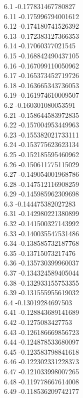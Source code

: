 {6.1	-0.177831467780827\\
6.11	-0.175996794001612\\
6.12	-0.174180741526392\\
6.13	-0.172383127366353\\
6.14	-0.17060377021545\\
6.15	-0.168842490437105\\
6.16	-0.167099110050962\\
6.17	-0.165373452719726\\
6.18	-0.163665343736053\\
6.19	-0.161974610009507\\
6.2	-0.160301080053591\\
6.21	-0.158644583972835\\
6.22	-0.157004953449963\\
6.23	-0.155382021733111\\
6.24	-0.153775623623134\\
6.25	-0.152185595460962\\
6.26	-0.150611775115029\\
6.27	-0.149054001968786\\
6.28	-0.147512116908259\\
6.29	-0.145985962309698\\
6.3	-0.144475382027283\\
6.31	-0.142980221380899\\
6.32	-0.141500327143992\\
6.33	-0.140035547531486\\
6.34	-0.138585732187768\\
6.35	-0.13715073217476\\
6.36	-0.135730399960037\\
6.37	-0.134324589405044\\
6.38	-0.132933155753355\\
6.39	-0.131555955619032\\
6.4	-0.13019284697503\\
6.41	-0.128843689141689\\
6.42	-0.1275083427753\\
6.43	-0.126186669856723\\
6.44	-0.124878533680097\\
6.45	-0.123583798841618\\
6.46	-0.122302331228373\\
6.47	-0.121033998007265\\
6.48	-0.119778667614008\\
6.49	-0.118536209742177\\
}
